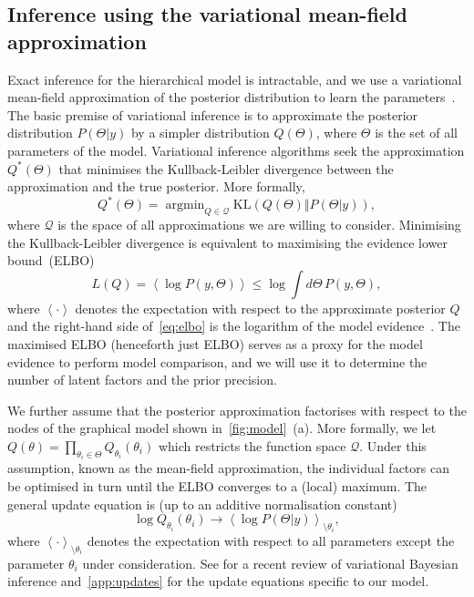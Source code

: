 \documentclass[onecolumn,pre,superscriptaddress, longbibliography, nofootinbib, notitlepage]{revtex4-1}
\newcommand{\E}[1]{\left\langle#1 \right\rangle}
\DeclareMathOperator*{\argmin}{argmin}
\begin{document}
\subsection{Inference using the variational mean-field approximation}

Exact inference for the hierarchical model is intractable, 
and we use a variational mean-field approximation of the posterior distribution to learn the parameters~\cite{Bishop2007}. The basic premise of variational inference is to approximate the posterior distribution $P(\Theta|y)$ by a simpler distribution $Q(\Theta)$, where $\Theta$ is the set of all parameters of the model. Variational inference algorithms seek the approximation $Q^*(\Theta)$ that minimises the Kullback-Leibler divergence between the approximation and the true posterior. More formally,
\[
    Q^*(\Theta) = \argmin_{Q\in\mathcal{Q}} \mathrm{KL}\left(Q(\Theta)\Vert P(\Theta|y)\right),
\]
where $\mathcal{Q}$ is the space of all approximations we are willing to consider. Minimising the Kullback-Leibler divergence is equivalent to maximising the evidence lower bound~(ELBO)
\begin{equation}
    L(Q) = \E{\log P(y, \Theta)} \leq \log \int d\Theta \, P(y, \Theta), \label{eq:elbo}
\end{equation}
where $\E{\cdot}$ denotes the expectation with respect to the approximate posterior $Q$ and the right-hand side of~\cref{eq:elbo} is the logarithm of the model evidence~\cite{Bishop2007}. The maximised ELBO (henceforth just ELBO) serves as a proxy for the model evidence to perform model comparison, and we will use it to determine the number of latent factors and the prior precision.

We further assume that the posterior approximation factorises with respect to the nodes of the graphical model shown in~\cref{fig:model}~(a). More formally, we let $Q(\theta)=\prod_{\theta_i\in\Theta} Q_{\theta_i}(\theta_i)$ which restricts the function space $\mathcal{Q}$. Under this assumption, known as the mean-field approximation, the individual factors can be optimised in turn until the ELBO converges to a (local) maximum. The general update equation is (up to an additive normalisation constant)
\[
    \log Q_{\theta_i}(\theta_i) \rightarrow \E{\log P(\Theta|y)}_{\setminus\theta_i},
\]
where $\E{\cdot}_{\setminus \theta_i}$ denotes the expectation with respect to all parameters except the parameter $\theta_i$ under consideration. See \citet{Blei2017} for a recent review of variational Bayesian inference and~\cref{app:updates} for the update equations specific to our model.
\end{document}
